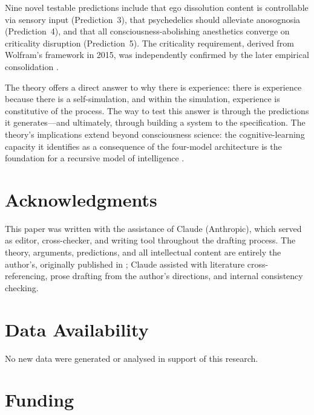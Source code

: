 \documentclass[12pt]{article}
\begin{document}
Nine novel testable predictions include that ego dissolution content is controllable via sensory input (Prediction~3), that psychedelics should alleviate anosognosia (Prediction~4), and that all consciousness-abolishing anesthetics converge on criticality disruption (Prediction~5). The criticality requirement, derived from Wolfram's framework in 2015, was independently confirmed by the later empirical consolidation \citep{HengenShew2025,AlgomShriki2026}.

The theory offers a direct answer to why there is experience: there is experience because there is a self-simulation, and within the simulation, experience is constitutive of the process. The way to test this answer is through the predictions it generates---\hspace{0pt}and ultimately, through building a system to the specification. The theory's implications extend beyond consciousness science: the cognitive-learning capacity it identifies as a consequence of the four-model architecture is the foundation for a recursive model of intelligence \citep{Gruber2026a}.




\section*{Acknowledgments}

This paper was written with the assistance of Claude (Anthropic), which served as editor, cross-checker, and writing tool throughout the drafting process. The theory, arguments, predictions, and all intellectual content are entirely the author's, originally published in \citet{Gruber2015}; Claude assisted with literature cross-referencing, prose drafting from the author's directions, and internal consistency checking.


\section*{Data Availability}

No new data were generated or analysed in support of this research.


\section*{Funding}
\end{document}
